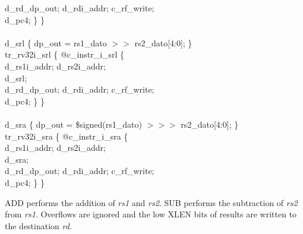 {\indent \hspace{\parindent} d\_rd\_dp\_out; d\_rdi\_addr; c\_rf\_write;  \\%
\indent \hspace{\parindent} d\_pc4; \} \} \\%
\\
\indent d\_srl \{ dp\_out = rs1\_dato $>>$ rs2\_dato[4:0]; \}\\%
\indent tr\_rv32i\_srl \{ @c\_instr\_i\_srl \{ \\%
\indent \hspace{\parindent} d\_rs1i\_addr; d\_rs2i\_addr; \\%
\indent \hspace{\parindent} d\_srl; \\%
\indent \hspace{\parindent} d\_rd\_dp\_out; d\_rdi\_addr; c\_rf\_write;  \\%
\indent \hspace{\parindent} d\_pc4; \} \} \\%
\\
\indent d\_sra \{ dp\_out = \$signed(rs1\_dato) $>>>$ rs2\_dato[4:0]; \}\\%
\indent tr\_rv32i\_sra \{ @c\_instr\_i\_sra \{ \\%
\indent \hspace{\parindent} d\_rs1i\_addr; d\_rs2i\_addr; \\%
\indent \hspace{\parindent} d\_sra; \\%
\indent \hspace{\parindent} d\_rd\_dp\_out; d\_rdi\_addr; c\_rf\_write;  \\%
\indent \hspace{\parindent} d\_pc4; \} \} \\%
}

ADD performs the addition of {\em rs1} and {\em rs2}. SUB performs the
subtraction of {\em rs2} from {\em rs1}.  Overflows are ignored and the low XLEN
bits of results are written to the destination {\em rd}.

